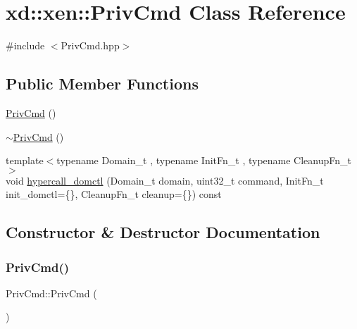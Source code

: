 \hypertarget{classxd_1_1xen_1_1_priv_cmd}{}\section{xd\+:\+:xen\+:\+:Priv\+Cmd Class Reference}
\label{classxd_1_1xen_1_1_priv_cmd}


{\ttfamily \#include $<$Priv\+Cmd.\+hpp$>$}

\subsection*{Public Member Functions}
\begin{DoxyCompactItemize}
\item 
\mbox{\hyperlink{classxd_1_1xen_1_1_priv_cmd_a0f6e63b2a55214a2a89b75733d879fc4}{Priv\+Cmd}} ()
\item 
\mbox{\hyperlink{classxd_1_1xen_1_1_priv_cmd_a716f6b68cd5c4f4c7767ce90ecaf57a6}{$\sim$\+Priv\+Cmd}} ()
\item 
{\footnotesize template$<$typename Domain\+\_\+t , typename Init\+Fn\+\_\+t , typename Cleanup\+Fn\+\_\+t $>$ }\\void \mbox{\hyperlink{classxd_1_1xen_1_1_priv_cmd_a568c8d4074df8c5144210b6ae9db199f}{hypercall\+\_\+domctl}} (Domain\+\_\+t domain, uint32\+\_\+t command, Init\+Fn\+\_\+t init\+\_\+domctl=\{\}, Cleanup\+Fn\+\_\+t cleanup=\{\}) const
\end{DoxyCompactItemize}


\subsection{Constructor \& Destructor Documentation}
\mbox{\label{classxd_1_1xen_1_1_priv_cmd_a0f6e63b2a55214a2a89b75733d879fc4}} 
\subsubsection{\texorpdfstring{Priv\+Cmd()}{PrivCmd()}}
{\footnotesize\ttfamily Priv\+Cmd\+::\+Priv\+Cmd (\begin{DoxyParamCaption}{ }\end{DoxyParamCaption})}

\mbox{\label{classxd_1_1xen_1_1_priv_cmd_a716f6b68cd5c4f4c7767ce90ecaf57a6}} 
